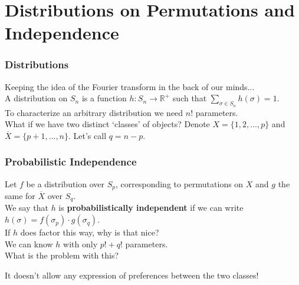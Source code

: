 \documentclass{beamer} %
\theoremstyle{definition} %
\def \pausenl {\pause $ \ $\\}
\begin{document}
\section{Distributions on Permutations and Independence}

\begin{frame}
	\frametitle{Distributions}
	
	Keeping the idea of the Fourier transform in the back of our minds...\\
	\pausenl
	A distribution on $S_n$ is a function $h: S_n \rightarrow \mathbb{R}^+$ such that $\sum\limits_{\sigma\in S_n} h(\sigma) = 1$.\\
	
	\pausenl
	
	To characterize an arbitrary distribution we need $n!$ parameters.\\
	
	\pausenl
	What if we have two distinct `classes' of objects?  Denote ${X} = \{1,2,\dots,p\}$ and $\overline{X} = \{p+1,\dots,n\}$.  Let's call $q=n-p$.
	
	
	
	
\end{frame}

\begin{frame}
	\frametitle{Probabilistic Independence}
	
	Let $f$ be a distribution over $S_p$, corresponding to permutations on $X$ and $g$ the same for $\overline{X}$ over $S_q$.\\
	
	\pausenl
	
	We say that $h$ is \textbf{probabilistically independent} if we can write $h(\sigma) = f(\sigma_p)\cdot g(\sigma_q)$.\\ 
	
	\pausenl
	
	If $h$ does factor this way, why is that nice?
	\pausenl
	We can know $h$ with only $p! + q!$ parameters.\\
	
	\pausenl
	
	What is the problem with this?
	
	\pausenl
	
	It doesn't allow any expression of preferences between the two classes!
\end{frame}
\end{document}
